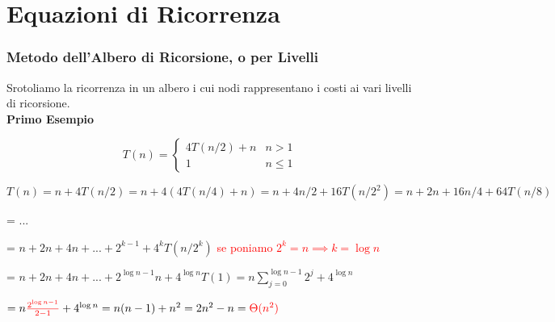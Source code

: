 \documentclass[../cheatSheetAlgoritmi.tex]{subfiles}
\begin{document}
\chapter{Equazioni di Ricorrenza}
\subsection{Metodo dell'Albero di Ricorsione, o per Livelli}
Srotoliamo la ricorrenza in un albero i cui nodi rappresentano i costi ai vari livelli di ricorsione.\\
\textbf{Primo Esempio}
\begin{center}
	\begin{equation*}
  		T(n)=\begin{cases}
    		4T(n/2) + n & \text{$n > 1$}\\
    		1 & \text{$n \leq 1$}
  		\end{cases}
	\end{equation*}
\end{center}
$T(n) = n + 4T(n/2) = n + 4(4T(n/4) + n) = n + 4n/2 + 16T(n/2^{2}) = n + 2n + 16n/4 + 64T(n/8)$

= ...

= $n + 2n + 4n + ... + 2^{k-1} + 4^{k}T(n/2^{k})$ \textcolor{red}{se poniamo $2^{k} = n \implies k = \log{n}$}

= $n + 2n + 4n + ... + 2^{\log{n-1}}n + 4^{\log{n}}T(1) = n \sum\limits_{j=0}^{\log{n-1}} {2^{j}} + 4^{\log{n}}$

$= n \textcolor{red}{\frac{2^{\log{n}-1}}{2-1}} + 4^{\log{n}} = n(n-1) + n^{2} = 2n^{2} - n = \textcolor{red}{\Theta(n^{2})}$

\bigskip
\end{document}
